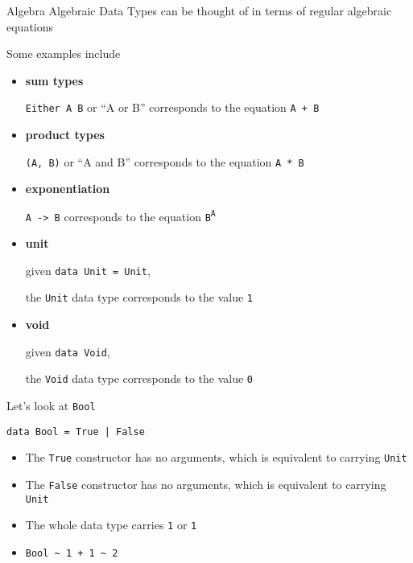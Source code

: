 \begin{frame}
\begin{block}{Algebra}
Algebraic Data Types can be thought of in terms of regular algebraic equations
\end{block}
\end{frame}

\begin{frame}
\begin{block}{Some examples include}
\begin{itemize}
  \item<1-> \textbf{sum types}

            \lstinline{Either A B} or ``A or B'' corresponds to the equation \lstinline{A + B}
  \item<2-> \textbf{product types}

            \lstinline{(A, B)} or ``A and B'' corresponds to the equation \lstinline{A * B}
  \item<3-> \textbf{exponentiation}

            \lstinline{A -> B} corresponds to the equation \lstinline{B}\textsuperscript{\lstinline{A}}
  \item<4-> \textbf{unit}

            given \lstinline{data Unit = Unit},

            the \lstinline{Unit} data type corresponds to the value \lstinline{1}
  \item<5-> \textbf{void}

            given \lstinline{data Void},

            the \lstinline{Void} data type corresponds to the value \lstinline{0}
\end{itemize}
\end{block}
\end{frame}

\begin{frame}[fragile]
\begin{block}{Let's look at \lstinline{Bool}}
\begin{lstlisting}
data Bool = True | False
\end{lstlisting}
\begin{itemize}
  \item<1-> The \lstinline{True} constructor has no arguments, which is equivalent to carrying \lstinline{Unit}
  \item<1-> The \lstinline{False} constructor has no arguments, which is equivalent to carrying \lstinline{Unit}
  \item<2-> The whole data type carries \lstinline{1} or \lstinline{1}
  \item<2-> \lstinline{Bool ~ 1 + 1 ~ 2}
\end{itemize}
\end{block}
\end{frame}

